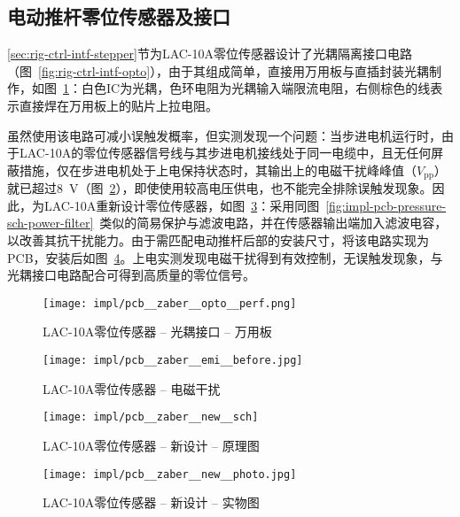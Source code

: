 

\subsection{电动推杆零位传感器及接口}\label{sec:impl-pcb-zaber}

\ref{sec:rig-ctrl-intf-stepper}节为LAC-10A零位传感器设计了光耦隔离接口电路（图~\ref{fig:rig-ctrl-intf-opto}），由于其组成简单，直接用万用板与直插封装光耦制作，如图~\ref{fig:impl-pcb-zaber-opto-perf}：白色IC为光耦，色环电阻为光耦输入端限流电阻，右侧棕色的线表示直接焊在万用板上的贴片上拉电阻。

虽然使用该电路可减小误触发概率，但实测发现一个问题：当步进电机运行时，由于LAC-10A的零位传感器信号线与其步进电机接线处于同一电缆中，且无任何屏蔽措施，仅在步进电机处于上电保持状态时，其输出上的电磁干扰峰峰值（$V_{\mathrm{pp}}$）就已超过\SI{8}{\V}（图~\ref{fig:impl-pcb-zaber-emi-before}），即使使用较高电压供电，也不能完全排除误触发现象。因此，为LAC-10A重新设计零位传感器，如图~\ref{fig:impl-pcb-zaber-new-sch}：采用同图~\ref{fig:impl-pcb-pressure-sch-power-filter}~类似的简易保护与滤波电路，并在传感器输出端加入滤波电容，以改善其抗干扰能力。由于需匹配电动推杆后部的安装尺寸，将该电路实现为PCB，安装后如图~\ref{fig:impl-pcb-zaber-new-photo}。上电实测发现电磁干扰得到有效控制，无误触发现象，与光耦接口电路配合可得到高质量的零位信号。

\begin{figure}[tbhp]
\centering
\texttt{[image: impl/pcb\_\_zaber\_\_opto\_\_perf.png]}
\caption{LAC-10A零位传感器 -- 光耦接口 -- 万用板}
\label{fig:impl-pcb-zaber-opto-perf}
\end{figure}

\begin{figure}[tbhp]
\centering
\texttt{[image: impl/pcb\_\_zaber\_\_emi\_\_before.jpg]}
\caption{LAC-10A零位传感器 -- 电磁干扰}
\label{fig:impl-pcb-zaber-emi-before}
\end{figure}

\begin{figure}[p]
\centering
\texttt{[image: impl/pcb\_\_zaber\_\_new\_\_sch]}
\caption{LAC-10A零位传感器 -- 新设计 -- 原理图}
\label{fig:impl-pcb-zaber-new-sch}
\end{figure}

\begin{figure}[p]
\centering
\texttt{[image: impl/pcb\_\_zaber\_\_new\_\_photo.jpg]}
\caption{LAC-10A零位传感器 -- 新设计 -- 实物图}
\label{fig:impl-pcb-zaber-new-photo}
\end{figure}


